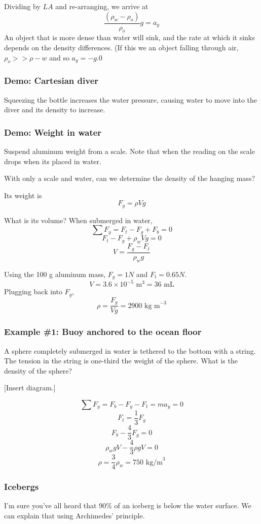 Dividing by $LA$ and re-arranging, we arrive at
$$\frac{(\rho_w-\rho_o)}{\rho_o}g=a_y$$
An object that is more dense than water will sink, and the rate at which it sinks depends on the density differences. (If this we an object falling through air, $\rho_o>>\rho-w$ and so $a_y=-g$.0

\subsubsection{Demo: Cartesian diver}
Squeezing the bottle increases the water pressure, causing water to move into the diver and its density to increase.

\subsubsection{Demo: Weight in water}
Suspend aluminum weight from a scale. Note that when the reading on the scale drops when its placed in water.

With only a scale and water, can we determine the density of the hanging mass?

Its weight is
$$F_g = \rho Vg$$

What is its volume? When submerged in water,
$$\sum F_y = F_t-F_g+F_b = 0$$
$$F_t-F_g + \rho_w V g = 0$$
$$V=\frac{F_g - F_t}{\rho_w g}$$

Using the 100 g aluminum mass, $F_g = 1 N$ and $F_t = 0.65 N$.
$$V = 3.6\times 10^{-5}\mbox{ m}^3 = 36\mbox{ mL}$$
Plugging back into $F_g$,
$$\rho = \frac{F_g}{Vg}=2900\mbox{ kg m}^{-3}$$


\subsubsection{Example \#1: Buoy anchored to the ocean floor}
A sphere completely submerged in water is tethered to the bottom with a string. The tension in the string is one-third the weight of the sphere. What is the density of the sphere?

[Insert diagram.]
\vspace{5cm}

$$\sum F_y = F_b-F_g-F_t = ma_y = 0$$
$$F_t = \frac{1}{3}F_g$$
$$F_b-\frac{4}{3}F_g = 0$$
$$\rho_wgV-\frac{4}{3}\rho gV=0$$
$$\rho=\frac{3}{4}\rho_w=\boxed{750\mbox{ kg/m}^3}$$


\subsubsection{Icebergs}
I'm sure you've all heard that 90\% of an iceberg is below the water surface. We can explain that using Archimedes' principle.

